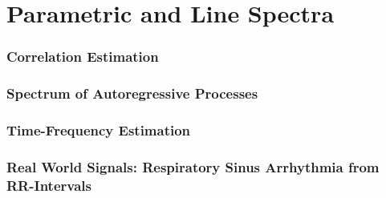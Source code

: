 \documentclass[main.tex]{subfiles}
\begin{document}
\section{Parametric and Line Spectra}


\subsubsection{Correlation Estimation}




\subsubsection{Spectrum of Autoregressive Processes}





\subsubsection{Time-Frequency Estimation}




\subsubsection{Real World Signals: Respiratory Sinus Arrhythmia from RR-Intervals}

\pagebreak
\end{document}
